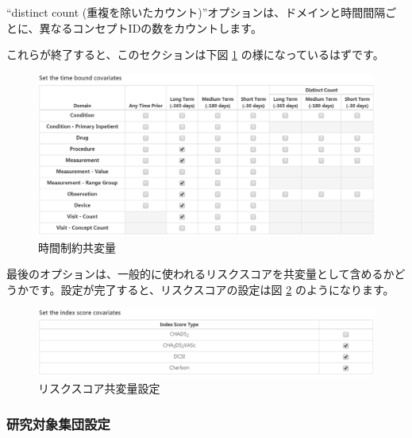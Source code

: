\documentclass[
  11pt]{book}
\theoremstyle{definition}
\theoremstyle{definition}
\theoremstyle{definition}
\theoremstyle{definition}
\theoremstyle{remark}
\begin{document}
``distinct count (重複を除いたカウント)''オプションは、ドメインと時間間隔ごとに、異なるコンセプトIDの数をカウントします。

これらが終了すると、このセクションは下図 \ref{fig:covariateSettings5} の様になっているはずです。

\begin{figure}

{\centering \includegraphics[width=1\linewidth]{images/PatientLevelPrediction/covariateSettings5} 

}

\caption{時間制約共変量}\label{fig:covariateSettings5}
\end{figure}

最後のオプションは、一般的に使われるリスクスコアを共変量として含めるかどうかです。設定が完了すると、リスクスコアの設定は図 \ref{fig:covariateSettings6} のようになります。

\begin{figure}

{\centering \includegraphics[width=1\linewidth]{images/PatientLevelPrediction/covariateSettings6} 

}

\caption{リスクスコア共変量設定}\label{fig:covariateSettings6}
\end{figure}

\subsubsection*{研究対象集団設定}\label{ux7814ux7a76ux5bfeux8c61ux96c6ux56e3ux8a2dux5b9a}
\end{document}

